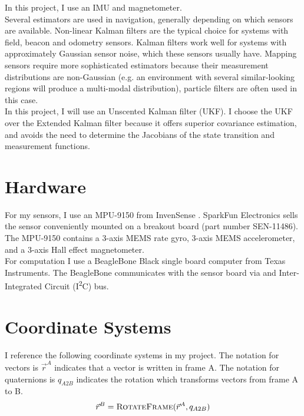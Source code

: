 \documentclass[conference]{IEEEtran}
\begin{document}
In this project, I use an IMU and magnetometer.\\

Several estimators are used in navigation, generally depending on which sensors are available. Non-linear Kalman filters are the typical choice for systems with field, beacon and odometry sensors. Kalman filters work well for systems with approximately Gaussian sensor noise, which these sensors usually have. Mapping sensors require more sophisticated estimators because their measurement distributions are non-Gaussian (e.g. an environment with several similar-looking regions will produce a multi-modal distribution), particle filters are often used in this case.\\

 In this project, I will use an Unscented Kalman filter (UKF). I choose the UKF over the Extended Kalman filter because it offers superior covariance estimation, and avoids the need to determine the Jacobians of the state transition and measurement functions.\\ 

\section{Hardware}
For my sensors, I use an MPU-9150 from InvenSense \cite{mpu9150}. SparkFun Electronics sells the sensor conveniently mounted on a breakout board (part number SEN-11486). The MPU-9150 contains a 3-axis MEMS rate gyro, 3-axis MEMS accelerometer, and a 3-axis Hall effect magnetometer.\\

For computation I use a BeagleBone Black single board computer from Texas Instruments. The BeagleBone communicates with the sensor board via and Inter-Integrated Circuit (I\textsuperscript{2}C) bus.\\

\section{Coordinate Systems}
I reference the following coordinate systems in my project. The notation for vectors is $\vec{r}^{A}$ indicates that a vector is written in frame A. The notation for quaternions is $q_{A2B}$ indicates the rotation which transforms vectors from frame A to B.
\begin{equation}
  \vec{r}^{B} = \textproc{RotateFrame}(\vec{r}^{A}, q_{A2B})
\end{equation}
\end{document}
